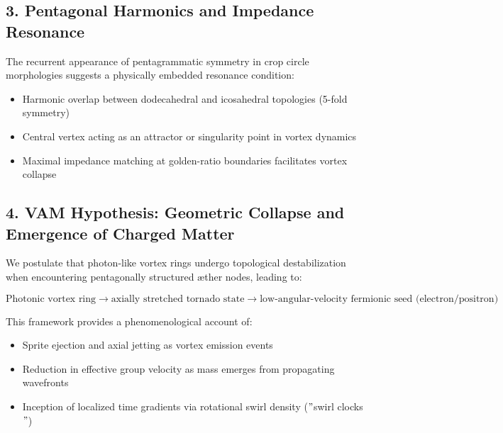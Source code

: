 \documentclass[11pt]{article}
\begin{document}
\subsection*{3. Pentagonal Harmonics and Impedance Resonance}

The recurrent appearance of pentagrammatic symmetry in crop circle morphologies suggests a physically embedded resonance condition:

\begin{itemize}

\item Harmonic overlap between dodecahedral and icosahedral topologies (5-fold symmetry)

\item Central vertex acting as an attractor or singularity point in vortex dynamics

\item Maximal impedance matching at golden-ratio boundaries facilitates vortex collapse

\end{itemize}


\subsection*{4. VAM Hypothesis: Geometric Collapse and Emergence of Charged Matter}

We postulate that photon-like vortex rings undergo topological destabilization when encountering pentagonally structured æther nodes, leading to:

\begin{equation}

\text{Photonic vortex ring} \rightarrow \text{axially stretched tornado state} \rightarrow \text{low-angular-velocity fermionic seed (electron/positron)}

\end{equation}

This framework provides a phenomenological account of:

\begin{itemize}

\item Sprite ejection and axial jetting as vortex emission events

\item Reduction in effective group velocity as mass emerges from propagating wavefronts

\item Inception of localized time gradients via rotational swirl density (\("\)swirl clocks\("\))

\end{itemize}
\end{document}

